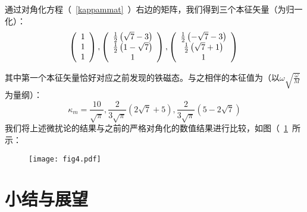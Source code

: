 通过对角化方程（~\ref{kappammat}~）右边的矩阵，我们得到三个本征矢量（为归一化）：
\begin{equation}
        \left(
            \begin{array}{c}
            1\\
            1\\
            1\\
            \end{array}
        \right),
        \left(
            \begin{array}{c}
            \frac{1}{2} \left(\sqrt{7}-3\right)\\
            \frac{1}{2} \left(1-\sqrt{7}\right)\\
            1\\
            \end{array}
        \right),
        \left(
            \begin{array}{c}
            \frac{1}{2} \left(-\sqrt{7}-3\right)\\
            \frac{1}{2} \left(\sqrt{7}+1\right)\\
            1\\
            \end{array}
        \right)\\
\end{equation}

其中第一个本征矢量恰好对应之前发现的铁磁态。与之相伴的本征值为（以$ \omega \sqrt{\frac{\omega}{M}}$为量纲）：
\begin{equation}
\kappa_m= \frac{10}{\sqrt{\pi}},\frac{2}{3\sqrt{\pi}} \left(2 \sqrt{7}+5\right),\frac{2}{3\sqrt{\pi}} \left(5-2 \sqrt{7}\right) 
\end{equation}
我们将上述微扰论的结果与之前的严格对角化的数值结果进行比较，如图（~\ref{fig:fig4}~所示：
\begin{figure}[!htbp]
    \centering
    \texttt{[image: fig4.pdf]}
    \label{fig:fig4}
\end{figure}



\section{小结与展望}\label{sec:spex-summary}

